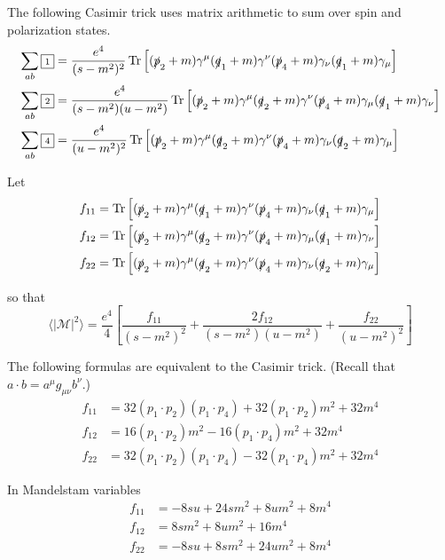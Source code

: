 The following Casimir trick uses matrix arithmetic to sum over spin and polarization states.
\begin{align*}
\sum_{ab}{\boxed{\scriptstyle1}}&=\frac{e^4}{(s-m^2)^2}\operatorname{Tr}
\left[
(\slashed p_2+m)\gamma^\mu(\slashed q_1+m)\gamma^\nu(\slashed p_4+m)\gamma_\nu(\slashed q_1+m)\gamma_\mu
\right]
\\
\sum_{ab}{\boxed{\scriptstyle2}}&=\frac{e^4}{(s-m^2)(u-m^2)}\operatorname{Tr}
\left[
(\slashed p_2+m)\gamma^\mu(\slashed q_2+m)\gamma^\nu(\slashed p_4+m)\gamma_\mu(\slashed q_1+m)\gamma_\nu
\right]
\\
\sum_{ab}{\boxed{\scriptstyle4}}&=\frac{e^4}{(u-m^2)^2}\operatorname{Tr}
\left[
(\slashed p_2+m)\gamma^\mu(\slashed q_2+m)\gamma^\nu(\slashed p_4+m)\gamma_\nu(\slashed q_2+m)\gamma_\mu
\right]
\end{align*}

Let
\begin{align*}
f_{11}&=\operatorname{Tr}
\left[
(\slashed p_2+m)\gamma^\mu(\slashed q_1+m)\gamma^\nu(\slashed p_4+m)\gamma_\nu(\slashed q_1+m)\gamma_\mu
\right]
\\
f_{12}&=\operatorname{Tr}
\left[
(\slashed p_2+m)\gamma^\mu(\slashed q_2+m)\gamma^\nu(\slashed p_4+m)\gamma_\mu(\slashed q_1+m)\gamma_\nu
\right]
\\
f_{22}&=\operatorname{Tr}
\left[
(\slashed p_2+m)\gamma^\mu(\slashed q_2+m)\gamma^\nu(\slashed p_4+m)\gamma_\nu(\slashed q_2+m)\gamma_\mu
\right]
\end{align*}

so that
\begin{equation*}
\langle|\mathcal{M}|^2\rangle=\frac{e^4}{4}
\left[
\frac{f_{11}}{(s-m^2)^2}+\frac{2f_{12}}{(s-m^2)(u-m^2)}+\frac{f_{22}}{(u-m^2)^2}
\right]
\end{equation*}

The following formulas are equivalent to the Casimir trick.
(Recall that $a\cdot b=a^\mu g_{\mu\nu}b^\nu$.)
\begin{equation*}
\begin{aligned}
f_{11}&=32 (p_1\cdot p_2) (p_1\cdot p_4) + 32 (p_1\cdot p_2) m^2 + 32 m^4
\\
f_{12}&=16 (p_1\cdot p_2) m^2 - 16 (p_1\cdot p_4) m^2 + 32 m^4
\\
f_{22}&=32 (p_1\cdot p_2) (p_1\cdot p_4) - 32 (p_1\cdot p_4) m^2 + 32 m^4
\end{aligned}
\tag{2}
\end{equation*}

In Mandelstam variables
\begin{equation*}
\begin{aligned}
f_{11}&=-8 s u + 24 s m^2 + 8 u m^2 + 8 m^4
\\
f_{12}&=8 s m^2 + 8 u m^2 + 16 m^4
\\
f_{22}&=-8 s u + 8 s m^2 + 24 u m^2 + 8 m^4
\end{aligned}
\tag{3}
\end{equation*}

